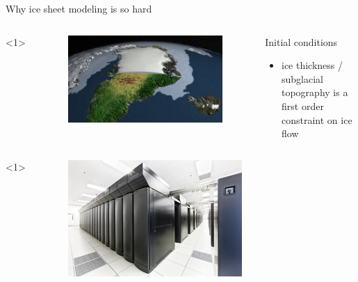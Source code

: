\documentclass[hide notes,intlimits,unknownkeysallowed]{beamer}
\begin{document}
\begin{frame}{Why ice sheet modeling is so hard}
    \begin{columns}[c]<1>
      \begin{column}{.28\linewidth}
        \begin{figure}
          \includegraphics[width=\linewidth]{canale_grande_V05}
        \end{figure}
      \end{column}
      \begin{column}{.67\linewidth}
        \begin{block}{Initial conditions}
        \begin{itemize}
        \item ice thickness / subglacial topography is a first order constraint on ice flow
        \end{itemize}
      \end{block}
      \end{column}
    \end{columns}
    \begin{columns}[c]<1>
      \begin{column}{.3\linewidth}
        \begin{figure}
          \includegraphics[width=\linewidth]{bw_front_sm}

\end{figure}
\end{column}
\end{columns}
\end{frame}
\end{document}
